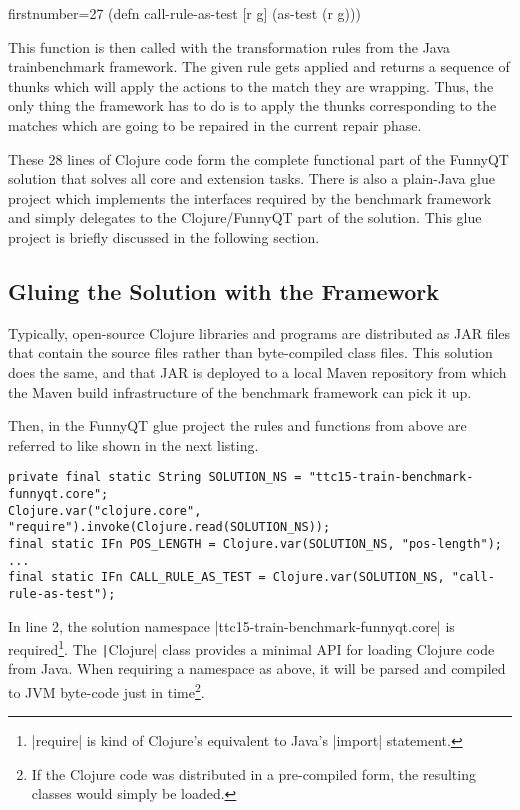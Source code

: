\documentclass[submission]{eptcs}
\newcommand{\code}{\clojureinline}
\begin{document}
\begin{clojurecode*}{firstnumber=27}
(defn call-rule-as-test [r g]
  (as-test (r g)))
\end{clojurecode*}

This function is then called with the transformation rules from the Java
trainbenchmark framework.  The given rule gets applied and returns a sequence
of thunks which will apply the actions to the match they are wrapping.  Thus,
the only thing the framework has to do is to apply the thunks corresponding to
the matches which are going to be repaired in the current repair phase.

These 28 lines of Clojure code form the complete functional part of the FunnyQT
solution that solves all core and extension tasks.  There is also a plain-Java
glue project which implements the interfaces required by the benchmark
framework and simply delegates to the Clojure/FunnyQT part of the solution.
This glue project is briefly discussed in the following section.


\subsection{Gluing the Solution with the Framework}
\label{sec:gluing}

Typically, open-source Clojure libraries and programs are distributed as JAR
files that contain the source files rather than byte-compiled class files.
This solution does the same, and that JAR is deployed to a local Maven
repository from which the Maven build infrastructure of the benchmark framework
can pick it up.

Then, in the FunnyQT glue project the rules and functions from above are
referred to like shown in the next listing.

\begin{verbatim}
private final static String SOLUTION_NS = "ttc15-train-benchmark-funnyqt.core";
Clojure.var("clojure.core", "require").invoke(Clojure.read(SOLUTION_NS));
final static IFn POS_LENGTH = Clojure.var(SOLUTION_NS, "pos-length");
...
final static IFn CALL_RULE_AS_TEST = Clojure.var(SOLUTION_NS, "call-rule-as-test");
\end{verbatim}

In line 2, the solution namespace \code|ttc15-train-benchmark-funnyqt.core| is
required\footnote{\code|require| is kind of Clojure's equivalent to Java's
  \code|import| statement.}.  The \texttt|Clojure| class provides a
minimal API for loading Clojure code from Java.  When requiring a namespace as
above, it will be parsed and compiled to JVM byte-code just in time\footnote{If
  the Clojure code was distributed in a pre-compiled form, the resulting
  classes would simply be loaded.}.
\end{document}
